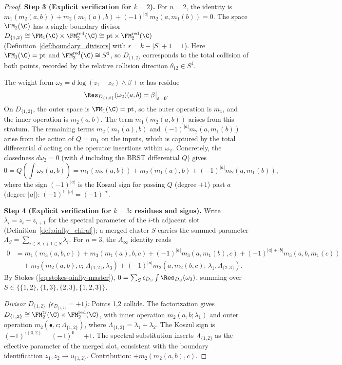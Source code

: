 \begin{proof}
\medskip
\textbf{Step 3 (Explicit verification for $k = 2$).}
For $n = 2$, the identity is $m_1(m_2(a,b)) + m_2(m_1(a),b) + (-1)^{|a|}\,m_2(a,m_1(b)) = 0$. The space $\FM_2(\C)$ has a single boundary divisor $D_{\{1,2\}} \cong \FM_1(\C) \times \FM_2^{\mathrm{red}}(\C) \cong \mathrm{pt} \times \FM_2^{\mathrm{red}}(\C)$ (Definition~\ref{def:boundary_divisors} with $r = k - |S| + 1 = 1$). Here $\FM_1(\C) = \mathrm{pt}$ and $\FM_2^{\mathrm{red}}(\C) \cong S^1$, so $D_{\{1,2\}}$ corresponds to the total collision of both points, recorded by the relative collision direction $\theta_{12} \in S^1$.

The weight form $\omega_2 = d\log(z_1 - z_2) \wedge \beta + \alpha$ has residue
\[
\Res_{D_{\{1,2\}}}(\omega_2)(a,b) = \beta\big|_{\varepsilon = 0}.
\]
On $D_{\{1,2\}}$, the outer space is $\FM_1(\C) = \mathrm{pt}$, so the outer operation is $m_1$, and the inner operation is $m_2(a,b)$. The term $m_1(m_2(a,b))$ arises from this stratum. The remaining terms $m_2(m_1(a),b)$ and $(-1)^{|a|}m_2(a,m_1(b))$ arise from the action of $Q = m_1$ on the inputs, which is captured by the total differential $d$ acting on the operator insertions within $\omega_2$. Concretely, the closedness $d\omega_2 = 0$ (with $d$ including the BRST differential $Q$) gives
\[
0 = Q\!\left(\int \omega_2(a,b)\right) = m_1(m_2(a,b)) + m_2(m_1(a),b) + (-1)^{|a|}m_2(a,m_1(b)),
\]
where the sign $(-1)^{|a|}$ is the Koszul sign for passing $Q$ (degree $+1$) past $a$ (degree $|a|$): $(-1)^{1 \cdot |a|} = (-1)^{|a|}$.

\medskip
\textbf{Step 4 (Explicit verification for $k = 3$: residues and signs).}
Write $\lambda_i = z_i - z_{i+1}$ for the spectral parameter of the $i$-th adjacent slot (Definition~\ref{def:ainfty_chiral}); a merged cluster $S$ carries the summed parameter $\Lambda_S = \sum_{i \in S,\, i+1 \in S} \lambda_i$. For $n = 3$, the $A_\infty$ identity reads
\begin{align*}
0 &= m_1(m_3(a,b,c)) + m_3(m_1(a),b,c) + (-1)^{|a|} m_3(a,m_1(b),c) + (-1)^{|a|+|b|} m_3(a,b,m_1(c)) \\
&\quad + m_2(m_2(a,b),c;\,\Lambda_{\{1,2\}},\lambda_3) + (-1)^{|a|} m_2(a,m_2(b,c);\,\lambda_1,\Lambda_{\{2,3\}}).
\end{align*}
By Stokes (\ref{eq:stokes-ainfty-master}), $0 = \sum_S \epsilon_{D_S} \int \Res_{D_S}(\omega_3)$, summing over $S \in \{\{1,2\},\{1,3\},\{2,3\},\{1,2,3\}\}$.

\emph{Divisor $D_{\{1,2\}}$ ($\epsilon_{D_{\{1,2\}}} = +1$):}
Points 1,2 collide. The factorization gives
\(D_{\{1,2\}}\cong
\FM_2^{\mathrm{tr}}(\C)\times\FM_2^{\mathrm{red}}(\C)\), with inner
operation \(m_2(a,b;\lambda_1)\) and outer operation
\(m_2(\bullet,c;\Lambda_{\{1,2\}})\), where
\(\Lambda_{\{1,2\}}=\lambda_1+\lambda_2\). The Koszul sign is
\((-1)^{\epsilon(0,2)}=(-1)^0=+1\). The spectral substitution inserts
\(\Lambda_{\{1,2\}}\) as the effective parameter of the merged slot,
consistent with the boundary identification \(z_1,z_2\to u_{\{1,2\}}\).
Contribution: \(+m_2(m_2(a,b),c)\).


\end{proof}
